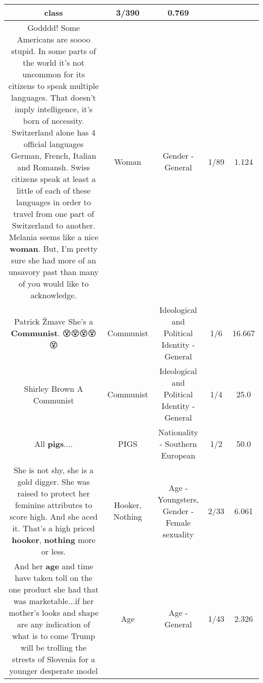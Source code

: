 \documentclass[11pt]{article}
\newlength\mylength
\begin{document}
\begin{center}
\begin{longtable}{|C{.65\mylength}|C{.30\mylength}|C{.12\mylength}|C{.12\mylength}|C{.12\mylength}|}
class & 3/390 & 0.769 \\  \hline
  \small Godddd! Some Americans are soooo stupid. In some parts of the world it's not uncommon for its citizens to speak multiple languages. That doesn't imply intelligence, it's born of necessity.  Switzerland alone has 4 official languages German, French, Italian and Romansh. Swiss citizens speak at least a little of each of these languages in order to travel from one part of Switzerland to another. Melania seems like a nice \textbf{woman}. But, I'm pretty sure she had more of an unsavory past than many of you would like to acknowledge.\normalsize   & Woman & Gender - General & 1/89 & 1.124 \\  \hline
  \small Patrick Žmavc She's a \textbf{Communist}. 😵😵😵😵😵\normalsize   & Communist &  Ideological and Political Identity - General & 1/6 & 16.667 \\  \hline
  \small Shirley Brown A Communist\normalsize   & Communist &  Ideological and Political Identity - General & 1/4 & 25.0 \\  \hline
  \small All \textbf{pigs}....\normalsize   & PIGS & Nationality - Southern European & 1/2 & 50.0 \\  \hline
  \small She is not shy, she is a gold digger. She was raised to protect her feminine attributes to score high. And she aced it. That's a high priced \textbf{hooker}, \textbf{nothing} more or less.\normalsize   & Hooker, Nothing & Age - Youngsters, Gender - Female sexuality & 2/33 & 6.061 \\  \hline
  \small And her \textbf{age} and time have taken toll on the one product she had that was marketable...if her mother's looks and shape are any indication of what is to come Trump will be trolling the streets of Slovenia for a younger desperate model\normalsize   & Age & Age - General & 1/43 & 2.326 \\  \hline

\end{longtable}
\end{center}
\end{document}
